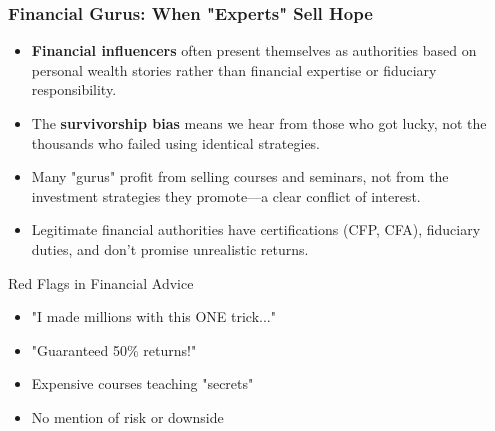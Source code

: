 \documentclass{beamer}
\begin{document}
	\begin{frame}
		\frametitle{Financial Gurus: When "Experts" Sell Hope}
		\begin{itemize}
			\item \textbf{Financial influencers} often present themselves as authorities based on personal wealth stories rather than financial expertise or fiduciary responsibility.
			\item The \textbf{survivorship bias} means we hear from those who got lucky, not the thousands who failed using identical strategies.
			\item Many "gurus" profit from selling courses and seminars, not from the investment strategies they promote—a clear conflict of interest.
			\item Legitimate financial authorities have certifications (CFP, CFA), fiduciary duties, and don't promise unrealistic returns.
		\end{itemize}
		
		\begin{alertblock}{Red Flags in Financial Advice}
			\begin{itemize}
				\item "I made millions with this ONE trick..."
				\item "Guaranteed 50\% returns!"
				\item Expensive courses teaching "secrets"
				\item No mention of risk or downside
			\end{itemize}
		\end{alertblock}
	\end{frame}
	
\end{document}
